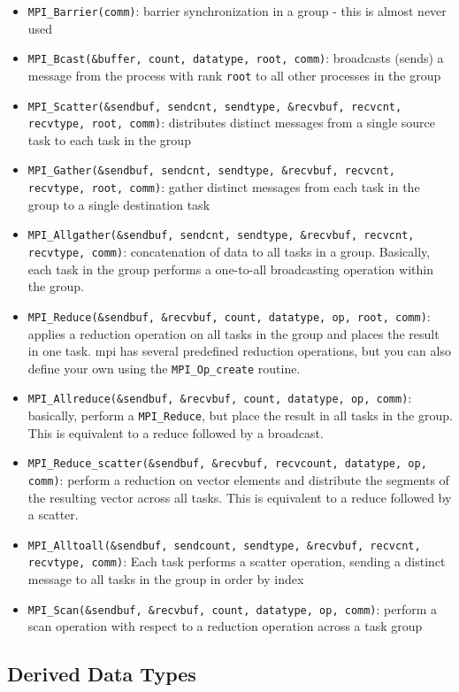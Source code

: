 \documentclass[10pt]{article}
\begin{document}
\begin{flushleft}
\begin{itemize}
\item {\tt MPI\_Barrier(comm)}: barrier synchronization in a group - this is almost never used
\item {\tt MPI\_Bcast(\&buffer, count, datatype, root, comm)}: broadcasts (sends) a message from the process with rank {\tt root} to all other processes in the group
\item {\tt MPI\_Scatter(\&sendbuf, sendcnt, sendtype, \&recvbuf, recvcnt, recvtype, root, comm)}: distributes distinct messages from a single source task to each task in the group
\item {\tt MPI\_Gather(\&sendbuf, sendcnt, sendtype, \&recvbuf, recvcnt, recvtype, root, comm)}: gather distinct messages from each task in the group to a single destination task
\item {\tt MPI\_Allgather(\&sendbuf, sendcnt, sendtype, \&recvbuf, recvcnt, recvtype, comm)}: concatenation of data to all tasks in a group. Basically, each task in the group performs a one-to-all broadcasting operation within the group. 
\item {\tt MPI\_Reduce(\&sendbuf, \&recvbuf, count, datatype, op, root, comm)}: applies a reduction operation on all tasks in the group and places the result in one task. \gls{mpi} has several predefined reduction operations, but you can also define your own using the {\tt MPI\_Op\_create} routine. 
\item {\tt MPI\_Allreduce(\&sendbuf, \&recvbuf, count, datatype, op, comm)}: basically, perform a {\tt MPI\_Reduce}, but place the result in all tasks in the group. This is equivalent to a reduce followed by a broadcast. 
\item {\tt MPI\_Reduce\_scatter(\&sendbuf, \&recvbuf, recvcount, datatype, op, comm)}: perform a reduction on vector elements and distribute the segments of the resulting vector across all tasks. This is equivalent to a reduce followed by a scatter.
\item {\tt MPI\_Alltoall(\&sendbuf, sendcount, sendtype, \&recvbuf, recvcnt, recvtype, comm)}: Each task performs a scatter operation, sending a distinct message to all tasks in the group in order by index
\item {\tt MPI\_Scan(\&sendbuf, \&recvbuf, count, datatype, op, comm)}: perform a scan operation with respect to a reduction operation across a task group
\end{itemize}

\subsection{Derived Data Types}


\end{flushleft}
\end{document}
